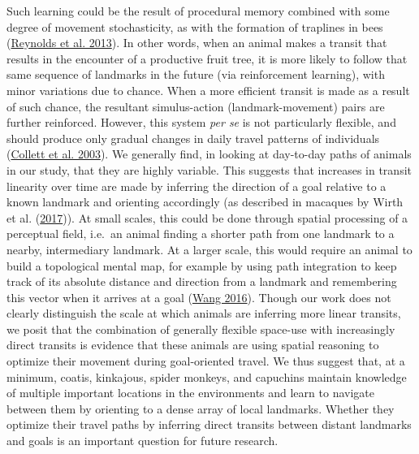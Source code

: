 \documentclass[twoside,12pt,final]{ucthesis-CA2012}
\begin{document}
\begin{ucmainmatter}
Such learning could be the result of procedural memory combined with some degree of movement stochasticity, as with the formation of traplines in bees (\protect\hyperlink{ref-reynolds2013}{Reynolds et al. 2013}). In other words, when an animal makes a transit that results in the encounter of a productive fruit tree, it is more likely to follow that same sequence of landmarks in the future (via reinforcement learning), with minor variations due to chance. When a more efficient transit is made as a result of such chance, the resultant simulus-action (landmark-movement) pairs are further reinforced. However, this system \emph{per se} is not particularly flexible, and should produce only gradual changes in daily travel patterns of individuals (\protect\hyperlink{ref-collett2003}{Collett et al. 2003}). We generally find, in looking at day-to-day paths of animals in our study, that they are highly variable. This suggests that increases in transit linearity over time are made by inferring the direction of a goal relative to a known landmark and orienting accordingly (as described in macaques by Wirth et al. (\protect\hyperlink{ref-wirth2017}{2017})). At small scales, this could be done through spatial processing of a perceptual field, i.e.~an animal finding a shorter path from one landmark to a nearby, intermediary landmark. At a larger scale, this would require an animal to build a topological mental map, for example by using path integration to keep track of its absolute distance and direction from a landmark and remembering this vector when it arrives at a goal (\protect\hyperlink{ref-wang2016}{Wang 2016}). Though our work does not clearly distinguish the scale at which animals are inferring more linear transits, we posit that the combination of generally flexible space-use with increasingly direct transits is evidence that these animals are using spatial reasoning to optimize their movement during goal-oriented travel. We thus suggest that, at a minimum, coatis, kinkajous, spider monkeys, and capuchins maintain knowledge of multiple important locations in the environments and learn to navigate between them by orienting to a dense array of local landmarks. Whether they optimize their travel paths by inferring direct transits between distant landmarks and goals is an important question for future research.


\end{ucmainmatter}
\end{document}
